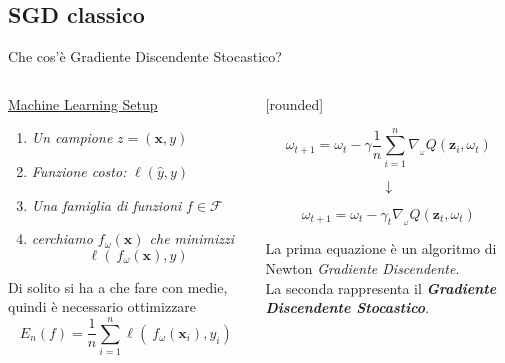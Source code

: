 \documentclass[xcolor=x11names,compress]{beamer}
\renewcommand{\(}{\begin{columns}}
\renewcommand{\)}{\end{columns}}
\newcommand{\<}[1]{\begin{column}{#1}}
\renewcommand{\>}{\end{column}}
\begin{document}
\subsection{SGD classico}
\begin{frame}{Che cos'è Gradiente Discendente Stocastico?}

\begin{columns}[c]
\begin{column}{0.5\textwidth}{\underline{Machine Learning Setup}}
\small{
\begin{enumerate}
  \item \textcolor{myblue}{\textit{Un campione}} $z = (\textbf{x}, y)$
  \item \textcolor{myblue}{\textit{Funzione costo:}} $ \ell (\hat{y}, y)$
  \item \textcolor{myblue}{\textit{Una famiglia di funzioni}} $f \in \mathcal{F}$
  \item \textcolor{myblue}{\textit{cerchiamo $f_{\omega} (\textbf{x})$ che minimizzi}}
  $$\ell (\ f_{\omega} (\textbf{x}), y)$$
\end{enumerate}
}

\textcolor{myred}{Di solito si ha a che fare con medie, quindi è necessario ottimizzare}
$$E_n (f) = \dfrac{1}{n} \sum_{i = 1}^n \ell (\ f_{\omega} (\textbf{x}_i), y_i)$$
\end{column}

\hspace{-10pt}
\vrule{}
\hspace{10pt}
\begin{column}{0.5\textwidth}

\vspace{-0.8cm}

[rounded]
\begin{block}{}
\vspace{-0.6cm}
$$\omega_{t+1} = \omega_{t} - \gamma \dfrac{1}{n} \sum_{i = 1}^n \nabla_{_{\omega}} Q(\textbf{z}_i, \omega_t)$$

\vspace{-0.6cm}
\Large{$$\downarrow$$}
\vspace{-1.8cm}

$$\omega_{t+1} = \omega_{t} - \gamma_t \nabla_{_{\omega}} Q(\textbf{z}_t, \omega_t)$$

\end{block}


\scriptsize{\textcolor{mygray}{\textcolor{myblue}{La prima} equazione è un algoritmo di Newton \textcolor{myblue}{\emph{Gradiente Discendente}}. 
\vspace{0.1cm}
\\ \textcolor{myred}{La seconda} rappresenta il \textcolor{myred}{\small{\textbf{\emph{Gradiente Discendente Stocastico}}}}}. 

}
\end{column}
\end{columns}
\end{frame}
\end{document}
